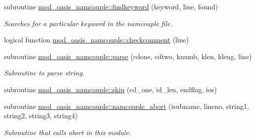 \begin{DoxyCompactItemize}
subroutine \hyperlink{namespacemod__oasis__namcouple_a5f87ffd480c100a94dcdf02f69b23080}{mod\+\_\+oasis\+\_\+namcouple\+::findkeyword} (keyword, line, found)
\begin{DoxyCompactList}\small\item\em Searches for a particular keyword in the namcouple file. \end{DoxyCompactList}\item 
logical function \hyperlink{namespacemod__oasis__namcouple_a4551fbe4bcd69bc6d0d4f6e1ee52ea86}{mod\+\_\+oasis\+\_\+namcouple\+::checkcomment} (line)
\item 
subroutine \hyperlink{namespacemod__oasis__namcouple_a743cf58ab4240aca9ed3e0e2bf1b873c}{mod\+\_\+oasis\+\_\+namcouple\+::parse} (cdone, cdtwo, knumb, klen, kleng, line)
\begin{DoxyCompactList}\small\item\em Subroutine to parse string. \end{DoxyCompactList}\item 
subroutine \hyperlink{namespacemod__oasis__namcouple_a951e3cbd0a1f031399779b6ab3a52112}{mod\+\_\+oasis\+\_\+namcouple\+::skip} (cd\+\_\+one, id\+\_\+len, endflag, ios)
\item 
subroutine \hyperlink{namespacemod__oasis__namcouple_aefebb1d6fd8ac62ea91f9e03265440a3}{mod\+\_\+oasis\+\_\+namcouple\+::namcouple\+\_\+abort} (isubname, lineno, string1, string2, string3, string4)
\begin{DoxyCompactList}\small\item\em Subroutine that calls abort in this module. \end{DoxyCompactList}\end{DoxyCompactItemize}
